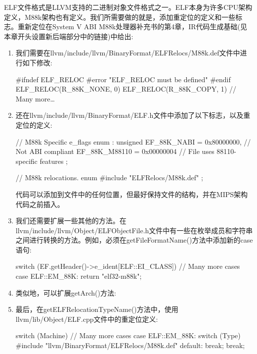 ELF文件格式是LLVM支持的二进制对象文件格式之一。ELF本身为许多CPU架构定义，M88k架构也有定义。我们所需要做的就是，添加重定位的定义和一些标志。重新定位在System V ABI M88k处理器补充书的第4章，IR代码生成基础(见本章开头设置新后端部分中的链接)中给出:

\begin{enumerate}
\item
我们需要在llvm/include/llvm/BinaryFormat/ELFRelocs/M88k.def文件中进行如下修改:

\begin{cpp}
#ifndef ELF_RELOC
#error "ELF_RELOC must be defined"
#endif
ELF_RELOC(R_88K_NONE, 0)
ELF_RELOC(R_88K_COPY, 1)
// Many more…
\end{cpp}

\item
还在llvm/include/llvm/BinaryFormat/ELF.h文件中添加了以下标志，以及重定位的定义:

\begin{cpp}
// M88k Specific e_flags
enum : unsigned {
    EF_88K_NABI = 0x80000000, // Not ABI compliant
    EF_88K_M88110 = 0x00000004 // File uses 88110-specific
    features
};

// M88k relocations.
enum {
    #include "ELFRelocs/M88k.def"
};
\end{cpp}

代码可以添加到文件中的任何位置，但最好保持文件的结构，并在MIPS架构代码之前插入。

\item
我们还需要扩展一些其他的方法。在llvm/include/llvm/Object/ELFObjectFile.h文件中有一些在枚举成员和字符串之间进行转换的方法。例如，必须在getFileFormatName()方法中添加新的case语句:

\begin{cpp}
switch (EF.getHeader()->e_ident[ELF::EI_CLASS]) {
    // Many more cases
    case ELF::EM_88K:
    return "elf32-m88k";
}
\end{cpp}

\item
类似地，可以扩展getArch()方法:

\begin{cpp}
switch (EF.getHeader().e_machine) {
    // Many more cases
    case ELF::EM_88K:
    return Triple::m88k;
\end{cpp}

\item
最后，在getELFRelocationTypeName()方法中，使用llvm/lib/Object/ELF.cpp文件中的重定位定义:

\begin{cpp}
switch (Machine) {
    // Many more cases
    case ELF::EM_88K:
    switch (Type) {
        #include "llvm/BinaryFormat/ELFRelocs/M88k.def"
        default:
        break;
    }
    break;
}
\end{cpp}


\end{enumerate}

